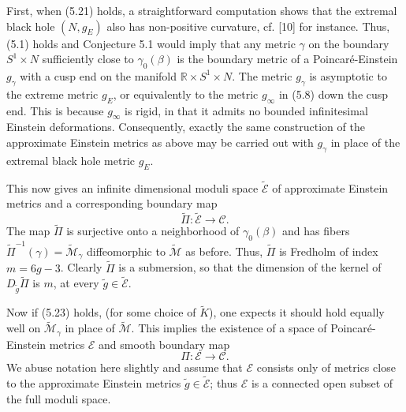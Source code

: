 \documentclass[11pt,amsfonts]{amsart}
\begin{document}
\medskip

 First, when (5.21) holds, a straightforward computation shows that the 
extremal black hole $(N, g_{E})$ also has non-positive curvature, cf. [10] 
for instance. Thus, (5.1) holds and Conjecture 5.1 would imply that any metric 
$\gamma$ on the boundary $S^{1}\times N$ sufficiently close to 
$\gamma_{0}(\beta)$ is the boundary metric of a Poincar\'e-Einstein 
$g_{\gamma}$ with a cusp end on the manifold ${\mathbb R}\times S^{1}\times N$. 
The metric $g_{\gamma}$ is asymptotic to the extreme metric $g_{E}$, or 
equivalently to the metric $g_{\infty}$ in (5.8) down the cusp end. This is 
because $g_{\infty}$ is rigid, in that it admits no bounded infinitesimal 
Einstein deformations. Consequently, exactly the same construction of the 
approximate Einstein metrics as above may be carried out with $g_{\gamma}$ 
in place of the extremal black hole metric $g_{E}$. 

  This now gives an infinite dimensional moduli space $\widetilde{\mathcal E}$ of 
approximate Einstein metrics and a corresponding boundary map 
\begin{equation} \label{e5.24}
\widetilde \Pi: \widetilde{\mathcal E} \rightarrow{\mathcal C} . 
\end{equation}
The map $\widetilde \Pi$ is surjective onto a neighborhood of 
$\gamma_{0}(\beta )$ and has fibers $\widetilde \Pi^{-1}(\gamma) = 
\widetilde{\mathcal M}_{\gamma}$ diffeomorphic to $\widetilde{\mathcal M}$ as 
before. Thus, $\widetilde \Pi$ is Fredholm of index $m = 6g-3$. Clearly 
$\widetilde \Pi$ is a submersion, so that the dimension of the kernel of 
$D_{\widetilde g}\widetilde \Pi$ is $m$, at every 
$\widetilde g\in\widetilde{\mathcal E}$. 

 Now if (5.23) holds, (for some choice of $\widetilde K$), one expects 
it should hold equally well on $\widetilde{\mathcal M}_{\gamma}$ in place 
of $\widetilde{\mathcal M}$. This implies the existence of a space of 
Poincar\'e-Einstein metrics ${\mathcal E}$ and smooth boundary map 
\begin{equation} \label{e5.25}
\Pi: {\mathcal E}  \rightarrow{\mathcal C} . 
\end{equation}
We abuse notation here slightly and assume that ${\mathcal E}$ consists 
only of metrics close to the approximate Einstein metrics 
$\widetilde g\in\widetilde{\mathcal E}$; thus ${\mathcal E}$ is a connected open 
subset of the full moduli space. 
\end{document}
